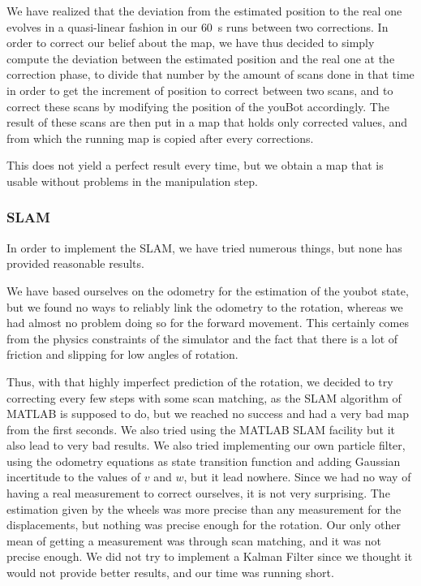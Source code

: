 \documentclass[a4paper, 10pt, conference]{ieeeconf}
\begin{document}
    We have realized that the deviation from the estimated position to the real one evolves in a quasi-linear fashion in our \SI{60}{\second} runs between two corrections. In order to correct our belief about the map, we have thus decided to simply compute the deviation between the estimated position and the real one at the correction phase, to divide that number by the amount of scans done in that time in order to get the increment of position to correct between two scans, and to correct these scans by modifying the position of the youBot accordingly. The result of these scans are then put in a map that holds only corrected values, and from which the running map is copied after every corrections.
    
    This does not yield a perfect result every time, but we obtain a map that is usable without problems in the manipulation step.
    
    \subsubsection{SLAM}
    
    In order to implement the SLAM, we have tried numerous things, but none has provided reasonable results. 
    
    We have based ourselves on the odometry for the estimation of the youbot state, but we found no ways to reliably link the odometry to the rotation, whereas we had almost no problem doing so for the forward movement. This certainly comes from the physics constraints of the simulator and the fact that there is a lot of friction and slipping for low angles of rotation.
    
    Thus, with that highly imperfect prediction of the rotation, we decided to try correcting every few steps with some scan matching, as the SLAM algorithm of MATLAB is supposed to do, but we reached no success and had a very bad map from the first seconds. We also tried using the MATLAB SLAM facility but it also lead to very bad results. We also tried implementing our own particle filter, using the odometry equations as state transition function and adding Gaussian incertitude to the values of $v$ and $w$, but it lead nowhere. Since we had no way of having a real measurement to correct ourselves, it is not very surprising. The estimation given by the wheels was more precise than any measurement for the displacements, but nothing was precise enough for the rotation. Our only other mean of getting a measurement was through scan matching, and it was not precise enough. We did not try to implement a Kalman Filter since we thought it would not provide better results, and our time was running short.
    
\end{document}
